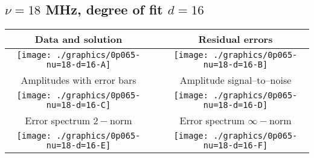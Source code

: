 

% 

\clearpage{}
\break{}

\subsection{$\nu = 18$ MHz, degree of fit $d = 16$}

\begin{table}[h]
    \begin{center}
        \begin{tabular}{ccc}
            Data and solution & \quad & Residual errors \\\hline
            \texttt{[image: ./graphics/0p065-nu=18-d=16-A]} &&
            \texttt{[image: ./graphics/0p065-nu=18-d=16-B]} \\[15pt]
            Amplitudes with error bars && Amplitude signal--to--noise \\\hline
            \texttt{[image: ./graphics/0p065-nu=18-d=16-C]} &&
            \texttt{[image: ./graphics/0p065-nu=18-d=16-D]} \\[15pt]
            Error spectrum $2-$norm && Error spectrum $\infty-$norm \\\hline
            \texttt{[image: ./graphics/0p065-nu=18-d=16-E]} &&
            \texttt{[image: ./graphics/0p065-nu=18-d=16-F]} \\[15pt]
        \end{tabular}
    \end{center}
\label{fig:elev=65, nu=18}
\end{table}



\endinput
